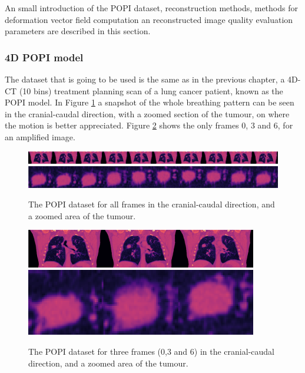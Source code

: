 An small introduction of the POPI dataset, reconstruction methods, methods for deformation vector field computation an reconstructed image quality evaluation parameters are described in this section. 






\subsubsection{4D POPI model}

The dataset that is going to be used is the same as in the previous chapter, a 4D-CT (10 bins) treatment planning scan of a lung cancer patient, known as the POPI model. In Figure \ref{fig:POPIfull} a snapshot of the whole breathing pattern can be seen in the cranial-caudal direction, with a zoomed section of the tumour, on where the motion is better appreciated. Figure \ref{fig:POPI3} shows the only frames 0, 3 and 6, for an amplified image.

\begin{figure}
\begin{center}

\includegraphics[width=\textwidth]{accuracyMC/imagerall.png} 
\includegraphics[width=\textwidth]{accuracyMC/tumourall.png} 


\end{center}

\caption[The whole 4D dataset in CC direction]{\label{fig:POPIfull} The POPI dataset for all frames in the cranial-caudal direction, and a zoomed area of the tumour.} 
\end{figure}
\begin{figure}
\begin{center}

\includegraphics[width=0.9\textwidth]{accuracyMC/imager3.png} 
\includegraphics[width=0.9\textwidth]{accuracyMC/tumour3.png} 


\end{center}

\caption[Three frames of the 4D dataset in CC direction]{\label{fig:POPI3} The POPI dataset for three frames (0,3 and 6) in the cranial-caudal direction, and a zoomed area of the tumour.} 
\end{figure}

